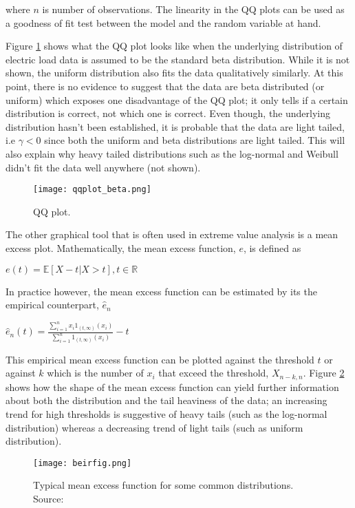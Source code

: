 \noindent where $n$ is number of observations. The linearity in the QQ plots can be used as a goodness of fit test between the model and the random variable at hand.

Figure \ref{fig:beta} shows what the QQ plot looks like when the underlying distribution of electric load data is assumed to be the standard beta distribution. While it is not shown, the uniform distribution also fits the data qualitatively similarly. At this point, there is no evidence to suggest that the data are beta distributed (or uniform) which exposes one disadvantage of the QQ plot; it only tells if a certain distribution is correct, not which one is correct. Even though, the underlying distribution hasn't been established, it is probable that the data are light tailed, i.e $\gamma < 0$ since both the uniform and beta distributions are light tailed. This will also explain why heavy tailed distributions such as the log-normal and Weibull didn't fit the data well anywhere (not shown). 

\begin{figure}
\centering
\texttt{[image: qqplot\_beta.png]}
\caption{\label{fig:beta} QQ plot.}
\end{figure}

The other graphical tool that is often used in extreme value analysis is a mean excess plot. Mathematically, the mean excess function, $e$,  is defined as

\centerline{$e(t) = \mathbb{E}[X-t | X>t], t \in \mathbb{R}$} 
 
In practice however, the mean excess function can be estimated by its the empirical counterpart, $\hat{e}_n$ \citep[ch.~1]{beirlant}

\centerline{$\hat{e}_n(t) = \frac{\sum\limits_{i=1}^n x_i 1_{(t,\infty)}(x_i)}{\sum\limits_{i=1}^n 1_{(t,\infty)}(x_i)} - t$}

This empirical mean excess function can be plotted against the threshold $t$ or against $k$ which is the number of $x_i$ that exceed the threshold, $X_{n-k,n}$. Figure \ref{fig:beir} shows how the shape of the mean excess function can yield further information about both the distribution and the tail heaviness of the data; an increasing trend for high thresholds is suggestive of heavy tails (such as the log-normal distribution) whereas a decreasing trend of light tails (such as uniform distribution).

\begin{figure}
\centering
\texttt{[image: beirfig.png]}
\caption{Typical mean excess function for some common distributions. Source: \cite{beirlant}}
\label{fig:beir} 
\end{figure}

